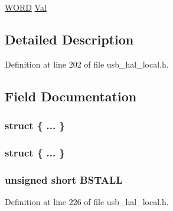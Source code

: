 \begin{DoxyCompactItemize}
\begin{tabbing}
\end{tabbing}\item 
\hyperlink{_generic_type_defs_8h_a2b0e863dadf920709ec53d9088ee7c91}{W\+O\+R\+D} \hyperlink{union___b_d_t___s_e_t_u_p_aa498550e7f87da9a38dc71609652e6bd}{Val}
\end{DoxyCompactItemize}


\subsection{Detailed Description}


Definition at line 202 of file usb\+\_\+hal\+\_\+local.\+h.



\subsection{Field Documentation}
\hypertarget{union___b_d_t___s_e_t_u_p_acbbe151a5f07e7ec658d9666b1eb6d30}{}\subsubsection[{"@526}]{\setlength{\rightskip}{0pt plus 5cm}struct \{ ... \} }\label{union___b_d_t___s_e_t_u_p_acbbe151a5f07e7ec658d9666b1eb6d30}
\hypertarget{union___b_d_t___s_e_t_u_p_a3cc43f0175be57ae91c3466b22e4e3cd}{}\subsubsection[{"@528}]{\setlength{\rightskip}{0pt plus 5cm}struct \{ ... \} }\label{union___b_d_t___s_e_t_u_p_a3cc43f0175be57ae91c3466b22e4e3cd}
\hypertarget{union___b_d_t___s_e_t_u_p_add9b71093ed94ddedd31285a91417aed}{}
\subsubsection[{B\+S\+T\+A\+L\+L}]{\setlength{\rightskip}{0pt plus 5cm}unsigned short B\+S\+T\+A\+L\+L}\label{union___b_d_t___s_e_t_u_p_add9b71093ed94ddedd31285a91417aed}


Definition at line 226 of file usb\+\_\+hal\+\_\+local.\+h.

\hypertarget{union___b_d_t___s_e_t_u_p_a101e364982c14c1b233fbe03b15c1d73}{}
